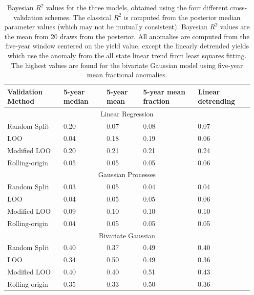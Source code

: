 \documentclass[12pt]{article}
\begin{document}
\begin{table}
\small
\centering
\caption{Bayesian $R^2$ values for the three models, obtained using the four different cross-validation schemes. The classical $R^2$ is computed from the posterior median parameter values (which may not be mutually consistent). Bayesian $R^2$ values are the mean from 20 draws from the posterior. All anomalies are computed from the five-year window centered on the yield value, except the linearly detrended yields which use the anomaly from the all state linear trend from least squares fitting. The highest values are found for the bivariate Gaussian model using five-year mean fractional anomalies.}
\label{table:cv_results}
\vskip 0.15in
\begin{tabular}{l llll}
\hline
Validation Method     & 5-year median         & 5-year mean          & 5-year mean fraction  & Linear detrending   \\ \hline

\multicolumn{5}{c}{Linear Regression}   \\ \hline
Random Split          & 0.20                  & 0.07                 & 0.08                  &  0.07  \\
LOO                   & 0.04                  & 0.18                 & 0.19                  &  0.06  \\
Modified LOO          & 0.20                  & 0.21                 & 0.21                  &  0.24  \\
Rolling-origin        & 0.05                  & 0.05                 & 0.05                  &  0.06  \\ \hline
\multicolumn{5}{c}{Gaussian Processes}   \\ \hline
Random Split          & 0.03                  & 0.05                 & 0.04                  &  0.04 \\
LOO                   & 0.04                  & 0.05                 & 0.05                  &  0.06 \\
Modified LOO          & 0.09                  & 0.10                 & 0.10                  &  0.10 \\
Rolling-origin        & 0.04                  & 0.05                 & 0.05                  &  0.05 \\ \hline
\multicolumn{5}{c}{Bivariate Gaussian} \\ \hline
Random Split          & 0.40                  & 0.37                 & 0.49                  &  0.40 \\
LOO                   & 0.34                  & 0.50                 & 0.49                  &  0.36 \\
Modified LOO          & 0.40                  & 0.40                 & 0.51                  &  0.43 \\
Rolling-origin        & 0.35                  & 0.33                 & 0.50                  &  0.36 \\ \hline
\end{tabular}
\end{table}
\end{document}
